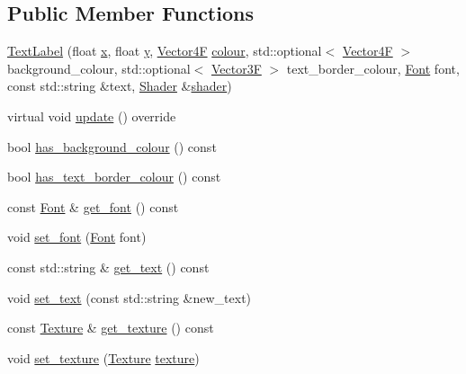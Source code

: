 \subsection*{Public Member Functions}
\begin{DoxyCompactItemize}
\item 
\mbox{\hyperlink{class_text_label_a8736731b5c5f1a8cffa984cfc332a859}{Text\+Label}} (float \mbox{\hyperlink{class_g_u_i_a7fa193a8ffb27bbb3bcc225e36f6d54d}{x}}, float \mbox{\hyperlink{class_g_u_i_a98f204f99ffc5ff6cffc9340bbb8c29b}{y}}, \mbox{\hyperlink{class_vector4}{Vector4F}} \mbox{\hyperlink{class_panel_a7c38e08ad80eb9972428450fb639bf66}{colour}}, std\+::optional$<$ \mbox{\hyperlink{class_vector4}{Vector4F}} $>$ background\+\_\+colour, std\+::optional$<$ \mbox{\hyperlink{class_vector3}{Vector3F}} $>$ text\+\_\+border\+\_\+colour, \mbox{\hyperlink{class_font}{Font}} font, const std\+::string \&text, \mbox{\hyperlink{class_shader}{Shader}} \&\mbox{\hyperlink{class_g_u_i_a64b007b31d0ec8a8704f9ab3bb2a7d3d}{shader}})
\item 
virtual void \mbox{\hyperlink{class_text_label_a350a9edc23e4d2a53374fddc5ddc61cc}{update}} () override
\item 
bool \mbox{\hyperlink{class_text_label_a551d9e453aed5769c47bf815f3954b87}{has\+\_\+background\+\_\+colour}} () const
\item 
bool \mbox{\hyperlink{class_text_label_a3ebd1440ba16deddd630f59e32def63e}{has\+\_\+text\+\_\+border\+\_\+colour}} () const
\item 
const \mbox{\hyperlink{class_font}{Font}} \& \mbox{\hyperlink{class_text_label_a9cf910ea092dd7b72c53a028e9ae3998}{get\+\_\+font}} () const
\item 
void \mbox{\hyperlink{class_text_label_a899b24fdb8ce8adf213cb70461aa1d91}{set\+\_\+font}} (\mbox{\hyperlink{class_font}{Font}} font)
\item 
const std\+::string \& \mbox{\hyperlink{class_text_label_a3594731b87e5c98a5d574e554e4ebcf0}{get\+\_\+text}} () const
\item 
void \mbox{\hyperlink{class_text_label_ad8d83bed9697b2f53249218f560fe1a8}{set\+\_\+text}} (const std\+::string \&new\+\_\+text)
\item 
const \mbox{\hyperlink{class_texture}{Texture}} \& \mbox{\hyperlink{class_text_label_ab8af6195b3e568d5f8a83024818b6d80}{get\+\_\+texture}} () const
\item 
void \mbox{\hyperlink{class_text_label_ae39dffa6e09e0ef03f2ef8f980e47076}{set\+\_\+texture}} (\mbox{\hyperlink{class_texture}{Texture}} \mbox{\hyperlink{class_panel_a682c2d8747451954095eb567b45d3fbd}{texture}})
\end{DoxyCompactItemize}
